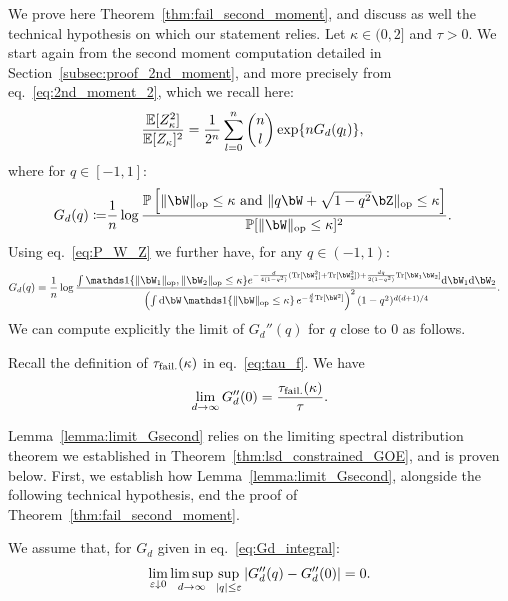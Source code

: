 We prove here Theorem~\ref{thm:fail_second_moment}, and discuss as well the technical hypothesis on which our statement relies.
Let $\kappa \in (0, 2]$ and $\tau > 0$. We start again from the second moment computation detailed in Section~\ref{subsec:proof_2nd_moment}, 
and more precisely from eq.~\eqref{eq:2nd_moment_2}, which we recall here:
\begin{align}\label{eq:2nd_moment_recall}
    \frac{\mathbb{E}[Z_\kappa^2]}{\mathbb{E}[Z_\kappa]^2} &= \frac{1}{2^n} \sum_{l=0}^n \binom{n}{l} \exp\{n G_d(q_l)\}, 
\end{align}
where for $q \in [-1,1]$:
\begin{align*}
    G_d(q) \coloneqq&  
    \frac{1}{n} \log \frac{\bbP\left[\|\bW\|_\op \leq \kappa \textrm{ and } \|q \bW + \sqrt{1-q^2} \bZ\|_\op \leq \kappa\right]}{\bbP[\|\bW\|_\op \leq \kappa]^2}.
\end{align*}
Using eq.~\eqref{eq:P_W_Z} we further have, for any $q \in (-1,1)$:
\begin{align}\label{eq:Gd_integral}
    G_d(q) &= \frac{1}{n} \log \frac{\int \indi\{\|\bW_1\|_\op, \|\bW_2\|_\op \leq \kappa\} e^{-\frac{d}{4(1-q^2)} (\Tr[\bW_1^2] + \Tr[\bW_2^2]) + \frac{dq}{2(1-q^2)} \Tr[\bW_1 \bW_2]} \rd \bW_1 \rd \bW_2}{\left(\int \rd \bW \, \indi\{\|\bW \|_\op \leq \kappa\} \, e^{-\frac{d}{4}\Tr[\bW^2]}\right)^2 (1-q^2)^{d(d+1)/4}}.
\end{align}
We can compute explicitly the limit of $G_d''(q)$ for $q$ close to $0$ as follows.
\begin{lemma}\label{lemma:limit_Gsecond}
    Recall the definition of $\tau_{\rm fail.}(\kappa)$ in eq.~\eqref{eq:tau_f}. We have
    \begin{equation*}
        \lim_{d \to \infty} G_d''(0) = \frac{\tau_{\rm fail.}(\kappa)}{\tau}.
    \end{equation*}
\end{lemma}
\noindent
Lemma~\ref{lemma:limit_Gsecond} relies on the limiting spectral distribution theorem we established in Theorem~\ref{thm:lsd_constrained_GOE}, 
and is proven below. First, we establish how Lemma~\ref{lemma:limit_Gsecond}, 
alongside the following technical hypothesis,
end the proof of Theorem~\ref{thm:fail_second_moment}.
\begin{hypothesis}\label{hyp:control_Gsecond}
    We assume that, for $G_d$ given in eq.~\eqref{eq:Gd_integral}:
    \begin{equation*}
        \lim_{\varepsilon \downarrow 0}\limsup_{d \to \infty} \sup_{|q| \leq \varepsilon} |G_d''(q) - G_d''(0)| = 0.
    \end{equation*}
\end{hypothesis}
